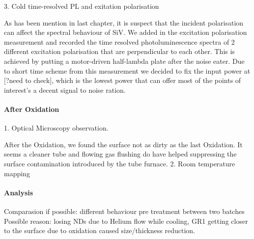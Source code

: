 3. Cold time-resolved PL and exitation polarisation

As has been mention in last chapter, it is suspect that the incident polarisation can affect the spectral behaviour of SiV. We added in the excitation polarisation measurement and recorded the time resolved photoluminescence spectra of 2 different excitation polarisation that are perpendicular to each other. This is achieved by putting a motor-driven half-lambda plate after the noise eater. 
Due to short time scheme from this measurement we decided to fix the input power at [?need to check], which is the lowest power that can offer most of the points of interest's a decent signal to noise ration.



\paragraph{After Oxidation} 

1. Optical Microscopy observation. 

After the Oxidation, we found the surface not as dirty as the last Oxidation. It seems a cleaner tube and flowing gas flushing do have helped suppressing the surface contamination introduced by the tube furnace.
2. Room temperature mapping



\paragraph{Analysis} 
Comparasion if possible: different behaviour pre treatment between two batches
Possible reason: losing NDs due to Helium flow while cooling, GR1 getting closer to the surface due to oxidation caused size/thickness reduction.


